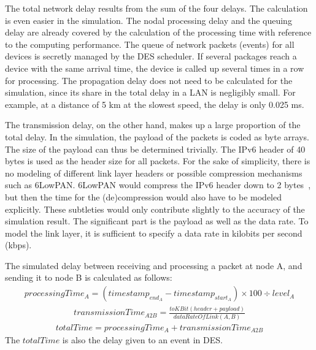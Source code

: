 \documentclass[english,version-2019-11]{uzl-thesis}
\begin{document}
The total network delay results from the sum of the four delays. The calculation is even easier in the simulation. The nodal processing delay and the queuing delay are already covered by the calculation of the processing time with reference to the computing performance. The queue of network packets (events) for all devices is secretly managed by the DES scheduler. If several packages reach a device with the same arrival time, the device is called up several times in a row for processing. The propagation delay does not need to be calculated for the simulation, since its share in the total delay in a LAN is negligibly small. For example, at a distance of 5 km at the slowest speed, the delay is only 0.025 ms.

The transmission delay, on the other hand, makes up a large proportion of the total delay. In the simulation, the payload of the packets is coded as byte arrays. The size of the payload can thus be determined trivially. The IPv6 header of 40 bytes is used as the header size for all packets. For the sake of simplicity, there is no modeling of different link layer headers or possible compression mechanisms such as 6LowPAN. 6LowPAN would compress the IPv6 header down to 2 bytes~\cite{rfc4944}, but then the time for the (de)compression would also have to be modeled explicitly. These subtleties would only contribute slightly to the accuracy of the simulation result. The significant part is the payload as well as the data rate. To model the link layer, it is sufficient to specify a data rate in kilobits per second (kbps).

The simulated delay between receiving and processing a packet at node A, and sending it to node B is calculated as follows:
\begin{align}
  processingTime_A = (timestamp_{end_A} - timestamp_{start_A}) \times 100 \div level_A
\end{align}
\begin{align}
  transmissionTime_{A2B} = \frac{toKBit(header + payload)}{dataRateOfLink(A, B)}
\end{align}
\begin{align}
  totalTime = processingTime_A + transmissionTime_{A2B}
\end{align}
The $totalTime$ is also the delay given to an event in DES.
\end{document}
